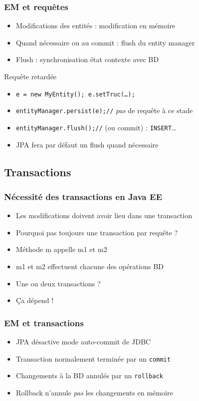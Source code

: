 \documentclass[english, french]{beamer}
\begin{document}
\begin{frame}
	\frametitle{EM et requêtes}
	\begin{itemize}
		\item Modifications des entités : modification en mémoire
		\item Quand nécessaire ou au commit : flush du entity manager
		\item Flush : synchronisation état contexte avec BD
	\end{itemize}
	\begin{exampleblock}{Requête retardée}
		\begin{itemize}
			\item \texttt{e = new MyEntity(); e.setTruc(…);}
			\item \texttt{entityManager.persist(e);//} \emph{pas} de requête à ce stade
			\item \texttt{entityManager.flush();//} (ou commit) : \texttt{INSERT}…
		\end{itemize}
	\end{exampleblock}
	\begin{itemize}
		\item JPA fera {\tiny par défaut} un flush quand nécessaire
	\end{itemize}
\end{frame}

\subsection{Transactions}
\begin{frame}
	\frametitle{Nécessité des transactions en Java EE}
	\begin{itemize}
		\item Les modifications doivent avoir lieu dans une transaction
		\item Pourquoi pas toujours une transaction par requête ? \pause
		\item Méthode m appelle m1 et m2
		\item m1 et m2 effectuent chacune des opérations BD
		\item Une ou deux transactions ? \pause
		\item Ça dépend !
	\end{itemize}
\end{frame}

\begin{frame}
	\frametitle{EM et transactions}
	\begin{itemize}
		\item JPA désactive mode auto-commit de JDBC
		\item Transaction {\tiny normalement} terminée par un \texttt{commit}
		\item Changements à la BD annulés par un \texttt{rollback}
		\item Rollback n’annule \emph{pas} les changements en mémoire
	\end{itemize}
\end{frame}
\end{document}
